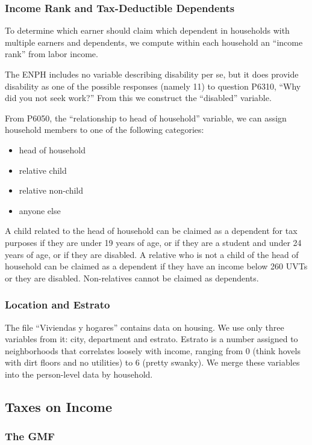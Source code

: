 \documentclass[12pt]{article}
\begin{document}
\begin{appendices}
\subsubsection {Income Rank and Tax-Deductible Dependents}
To determine which earner should claim which dependent
in households with multiple earners and dependents,
we compute within each household an ``income rank'' from labor income.

The ENPH includes no variable describing disability per se,
but it does provide disability as one of the possible responses (namely 11)
to question P6310, ``Why did you not seek work?''
From this we construct the ``disabled'' variable.

From P6050, the ``relationship to head of household'' variable,
we can assign household members to one of the following categories:
\begin{itemize}
\item head of household
\item relative child
\item relative non-child
\item anyone else
\end{itemize}

A child related to the head of household
can be claimed as a dependent for tax purposes
if they are under 19 years of age,
or if they are a student and under 24 years of age,
or if they are disabled.
A relative who is not a child of the head of household
can be claimed as a dependent
if they have an income below 260 UVTs or they are disabled.
Non-relatives cannot be claimed as dependents.


\subsubsection{Location and Estrato}

The file ``Viviendas y hogares'' contains data on housing.
We use only three variables from it: city, department and estrato.
Estrato is a number assigned to neighborhoods that correlates loosely with income,
ranging from 0 (think hovels with dirt floors and no utilities)
to 6 (pretty swanky).
We merge these variables into the person-level data by household.

\subsection{Taxes on Income}

\subsubsection{The GMF}


\end{appendices}
\end{document}
